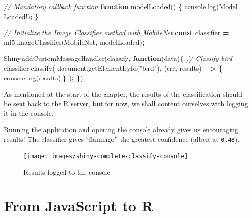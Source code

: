 \documentclass[
  10pt,
]{krantz}
\makeatletter
\newenvironment{Shaded}{\begin{snugshade}}{\end{snugshade}}
\newcommand{\AttributeTok}[1]{\textcolor[rgb]{0.61,0.61,0.61}{#1}}
\newcommand{\CommentTok}[1]{\textcolor[rgb]{0.37,0.37,0.37}{\textit{#1}}}
\newcommand{\KeywordTok}[1]{\textcolor[rgb]{0.27,0.27,0.27}{\textbf{#1}}}
\newcommand{\NormalTok}[1]{#1}
\newcommand{\OperatorTok}[1]{\textcolor[rgb]{0.43,0.43,0.43}{\textbf{#1}}}
\newcommand{\StringTok}[1]{\textcolor[rgb]{0.5,0.5,0.5}{#1}}
\newcommand{\VariableTok}[1]{\textcolor[rgb]{0,0,0}{#1}}
\newenvironment{kframe}{%
\medskip{}
\setlength{\fboxsep}{.8em}
 \def\at@end@of@kframe{}%
 \ifinner\ifhmode%
  \def\at@end@of@kframe{\end{minipage}}%
  \begin{minipage}{\columnwidth}%
 \fi\fi%
 \def\FrameCommand##1{\hskip\@totalleftmargin \hskip-\fboxsep
 \colorbox{shadecolor}{##1}\hskip-\fboxsep
     \hskip-\linewidth \hskip-\@totalleftmargin \hskip\columnwidth}%
 \MakeFramed {\advance\hsize-\width
   \@totalleftmargin\z@ \linewidth\hsize
   \@setminipage}}%
 {\par\unskip\endMakeFramed%
 \at@end@of@kframe}
\renewenvironment{Shaded}{\begin{kframe}}{\end{kframe}}
\makeatother
\begin{document}
\begin{Shaded}
\begin{Highlighting}[]
\CommentTok{// Mandatory callback function}
\KeywordTok{function} \AttributeTok{modelLoaded}\NormalTok{() }\OperatorTok{\{}
  \VariableTok{console}\NormalTok{.}\AttributeTok{log}\NormalTok{(}\StringTok{\textquotesingle{}Model Loaded!\textquotesingle{}}\NormalTok{)}\OperatorTok{;}
\OperatorTok{\}}

\CommentTok{// Initialize the Image Classifier method with MobileNet}
\KeywordTok{const}\NormalTok{ classifier }\OperatorTok{=} \VariableTok{ml5}\NormalTok{.}\AttributeTok{imageClassifier}\NormalTok{(}\StringTok{\textquotesingle{}MobileNet\textquotesingle{}}\OperatorTok{,}\NormalTok{ modelLoaded)}\OperatorTok{;}

\VariableTok{Shiny}\NormalTok{.}\AttributeTok{addCustomMessageHandler}\NormalTok{(}\StringTok{\textquotesingle{}classify\textquotesingle{}}\OperatorTok{,} \KeywordTok{function}\NormalTok{(data)}\OperatorTok{\{}
  \CommentTok{// Classify bird}
  \VariableTok{classifier}\NormalTok{.}\AttributeTok{classify}\NormalTok{(}
    \VariableTok{document}\NormalTok{.}\AttributeTok{getElementById}\NormalTok{(}\StringTok{"bird"}\NormalTok{)}\OperatorTok{,}\NormalTok{ (err}\OperatorTok{,}\NormalTok{ results) }\KeywordTok{=>} \OperatorTok{\{}
      \VariableTok{console}\NormalTok{.}\AttributeTok{log}\NormalTok{(results)}
    \OperatorTok{\}}
\NormalTok{  )}\OperatorTok{;}
\OperatorTok{\}}\NormalTok{)}\OperatorTok{;}
\end{Highlighting}
\end{Shaded}

As mentioned at the start of the chapter, the results of the classification should be sent back to the R server, but for now, we shall content ourselves with logging it in the console.

Running the application and opening the console already gives us encouraging results! The classifier gives ``flamingo'' the greatest confidence (albeit at \texttt{0.48}).

\begin{figure}[H]

{\centering \texttt{[image: images/shiny-complete-classify-console]} 

}

\caption{Results logged to the console}\label{fig:shiny-complete-classify-console}
\end{figure}

\hypertarget{shiny-complete-js2r}{%
\section{From JavaScript to R}\label{shiny-complete-js2r}}
\end{document}
